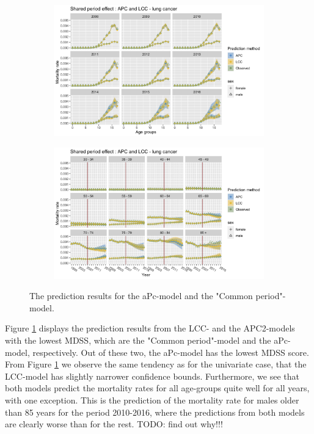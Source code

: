 \begin{figure}
    \centering
    \begin{subfigure}[b]{.45\linewidth}
        \includegraphics[width=\linewidth]{real-data/real-data-multivariate/Figures/multivariate-comparison-by-age-lung.png}
    \end{subfigure}
    \begin{subfigure}[b]{.45\linewidth}
        \includegraphics[width=\linewidth]{real-data/real-data-multivariate/Figures/multivariate-comparison-by-period-lung.png}
    \end{subfigure}
    \caption{The prediction results for the aPc-model and the "Common period"-model.}
    \label{fig:mv-APC-LCC-lung}
\end{figure}

Figure \ref{fig:mv-APC-LCC-lung} displays the prediction results from the LCC- and the APC2-models with the lowest MDSS, which are the "Common period"-model and the aPc-model, respectively. Out of these two, the aPc-model has the lowest MDSS score. From Figure \ref{fig:mv-APC-LCC-lung} we observe the same tendency as for the univariate case, that the LCC-model has slightly narrower confidence bounds. Furthermore, we see that both models predict the mortality rates for all age-groups quite well for all years, with one exception. This is the prediction of the mortality rate for males older than 85 years for the period 2010-2016, where the predictions from both models are clearly worse than for the rest. \textcolor{myDarkGreen}{TODO: find out why!!! }

